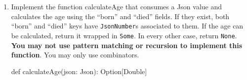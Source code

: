\begin{enumerate}
    \item Implement the function calculateAge that consumes a Json value
    and calculates the age using the ``born'' and ``died'' fields. If they
    exist, both ``born'' and ``died'' keys have \texttt{JsonNumber}s associated
    to them. If the age can be calculated, return it wrapped in \texttt{Some}.
    In every other case, return \texttt{None}. \textbf{You may not use pattern
    matching or recursion to implement this function}. You may only use
    combinators.
    \begin{scalacode}
    def calculateAge(json: Json): Option[Double]
    \end{scalacode}

\end{enumerate}


